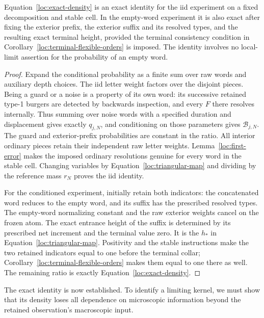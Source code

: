\begin{lemma}\label{loc:resampling-identity}
Equation~\eqref{loc:exact-density} is an exact identity for the iid
experiment on a fixed decomposition and stable cell.  In the
empty-word experiment it is also exact after fixing the exterior prefix,
the exterior suffix and its resolved types, and the resulting exact
terminal height, provided the terminal consistency condition in
Corollary~\ref{loc:terminal-flexible-orders} is imposed.  The
identity involves no local-limit assertion for the probability of an
empty word.
\end{lemma}
\begin{proof}
Expand the conditional probability as a finite sum over raw words and
auxiliary depth choices.  The iid letter weight factors over the
disjoint pieces.  Being a guard or a noise is a property of its own
word: its successive retained type-1 burgers are detected by backwards
inspection, and every $F$ there resolves internally.  Thus summing over
noise words with a specified duration and displacement gives exactly
$q_{j,N}$, and conditioning on those parameters gives
$\mathcal B_{j,N}$.  The guard and exterior-prefix probabilities are
constant in the ratio.  All interior ordinary pieces retain their
independent raw letter weights.  Lemma~\ref{loc:first-error}
makes the imposed ordinary resolutions genuine for every word in the
stable cell.  Changing variables by
Equation~\eqref{loc:triangular-map} and dividing by the reference mass
$r_N$ proves the iid identity.

For the conditioned experiment, initially retain both indicators: the
concatenated word reduces to the empty word, and its suffix has the
prescribed resolved types.  The empty-word normalizing constant and the
raw exterior weights cancel on the frozen atom.  The exact entrance
height of the suffix is determined by its prescribed net increment and
the terminal value zero.  It is the $h_*$ in
Equation~\eqref{loc:triangular-map}.  Positivity and the stable
instructions make the two retained indicators equal to one before the
terminal collar; Corollary~\ref{loc:terminal-flexible-orders} makes them
equal to one there as well.  The remaining ratio is exactly
Equation~\eqref{loc:exact-density}.
\end{proof}

The exact identity is now established. To identify a limiting kernel, we
must show that its density loses all dependence on microscopic information
beyond the retained observation's macroscopic input.

